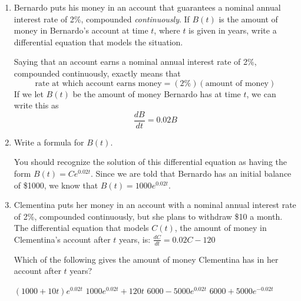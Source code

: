 \documentclass{article}
\begin{document}
\begin{enumerate}
  \begin{enumerate}
  
  \item
    \begin{problem}[1in]
      Bernardo puts his money in an account that guarantees a nominal
      annual interest rate of 2\%, compounded \emph{continuously}.  If $B(t)$ is the amount of money in Bernardo's account at time $t$, where $t$ is given in years, write a differential equation that models the situation.
    \end{problem}

    \begin{solution}
Saying that an account earns a
      nominal annual interest rate of 2\%, compounded continuously,
      exactly means that
      \[ \text{rate at which account earns money} = (2\%) (\text{amount of
        money})\]
      If we let $B(t)$ be the amount of money Bernardo has at time $t$, we
      can write this as
      \[ \frac{dB}{dt} = 0.02 B\]
    \end{solution}

    \item 
    \begin{problem}[\vfill] Write a formula for $B(t)$.
    \end{problem}
    \begin{solution}
    You should recognize the solution of this differential equation as
      having the form $B(t) = C e^{0.02 t}$.  Since we are told that
      Bernardo has an initial balance of \$1000, we know that $B(t) =
      \boxed{ 1000 e^{0.02 t}}$. 
    \end{solution}

  \item 
  \begin{problem}[2in]
      Clementina puts her money in an account with a nominal annual
    interest rate of 2\%, compounded continuously, but she plans to
    withdraw \$10 a month. The differential equation that models $C(t)$, the amount of
        money in Clementina's account after $t$ years, is: $\frac{dC}{dt} = 0.02 C - 120$
        
        Which of the following gives the amount of money Clementina has in
        her account after $t$ years?
        \begin{enumerate}[label=\protect\maybecircle{\Alph*.}]
        \plainitem $(1000 + 10t) e^{0.02 t}$
        \plainitem $1000 e^{0.02 t} + 120 t$
        \circleitem $6000 - 5000 e^{0.02 t}$
        \plainitem $6000 + 5000 e^{-0.02 t}$
        \end{enumerate}          
      \end{problem}


\end{enumerate}
\end{enumerate}
\end{document}
